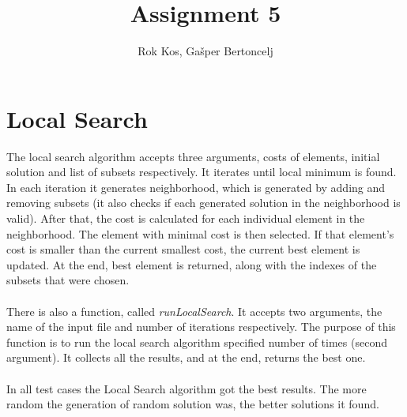 \documentclass{article}
\title{Assignment 5}
\author{Rok Kos, Gašper Bertoncelj}
\begin{document}
	
	\maketitle
	
	\section*{Local Search}
	
		The local search algorithm accepts three arguments, costs of elements, initial solution and list of subsets respectively. It iterates until local minimum is found. In each iteration it generates neighborhood, which is generated by adding and removing subsets (it also checks if each generated solution in the neighborhood is valid). After that, the cost is calculated for each individual element in the neighborhood. The element with minimal cost is then selected. If that element's cost is smaller than the current smallest cost, the current best element is updated. At the end, best element is returned, along with the indexes of the subsets that were chosen.
		\\ \\
		There is also a function, called \textit{runLocalSearch}. It accepts two arguments, the name of the input file and number of iterations respectively. The purpose of this function is to run the local search algorithm specified number of times (second argument). It collects all the results, and at the end, returns the best one.
		\\ \\	
		In all test cases the Local Search algorithm got the best results. The more random the generation of random solution was, the better solutions it found.
		\\
		
\end{document}
